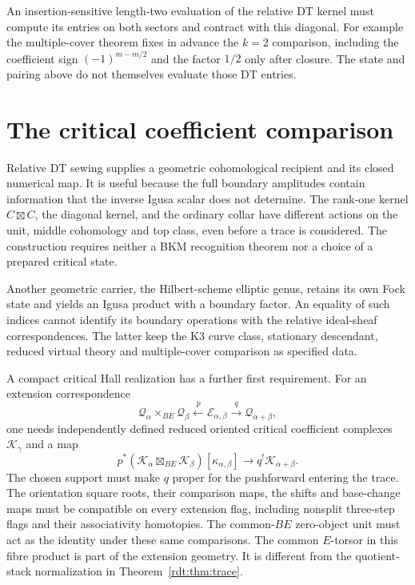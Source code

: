 An insertion-sensitive length-two evaluation of the relative DT
kernel must compute its entries on both sectors and contract with
this diagonal. For example the multiple-cover theorem fixes in
advance the $k=2$ comparison, including the coefficient sign
$(-1)^{m-m/2}$ and the factor $1/2$ only after closure. The state
and pairing above do not themselves evaluate those DT entries.

\section{The critical coefficient comparison}
\label{rdt:sec:critical}

Relative DT sewing supplies a geometric cohomological recipient and
its closed numerical map. It is useful because the full boundary
amplitudes contain information that the inverse Igusa scalar does
not determine. The rank-one kernel $C\boxtimes C$, the diagonal
kernel, and the ordinary collar have different actions on the unit,
middle cohomology and top class, even before a trace is considered.
The construction requires neither a BKM recognition theorem nor a
choice of a prepared critical state.

Another geometric carrier, the Hilbert-scheme elliptic genus, retains
its own Fock state and yields an Igusa product with a boundary factor.
An equality of such indices cannot identify its boundary operations
with the relative ideal-sheaf correspondences. The latter keep the
K3 curve class, stationary descendant, reduced virtual theory and
multiple-cover comparison as specified data.

A compact critical Hall realization has a further first requirement.
For an extension correspondence
\[
 \mathcal Q_\alpha\times_{BE}\mathcal Q_\beta
   \xleftarrow{\ p\ }\mathcal E_{\alpha,\beta}
   \xrightarrow{\ q\ }\mathcal Q_{\alpha+\beta},
\]
one needs independently defined reduced oriented critical coefficient
complexes $\mathscr K_\gamma$ and a map
\begin{equation}\label{rdt:eq:criticalmap}
 p^*(\mathscr K_\alpha\boxtimes_{BE}\mathscr K_\beta)
       [\kappa_{\alpha,\beta}]
       \longrightarrow q^!\mathscr K_{\alpha+\beta}.
\end{equation}
The chosen support must make $q$ proper for the pushforward entering
the trace. The orientation square roots, their comparison maps,
the shifts and base-change maps must be compatible on every
extension flag, including nonsplit three-step flags and their
associativity homotopies. The common-$BE$ zero-object unit must
act as the identity under these same comparisons.
The common $E$-torsor in this fibre product is part of the extension
geometry. It is different from the quotient-stack normalization in
Theorem~\ref{rdt:thm:trace}.

